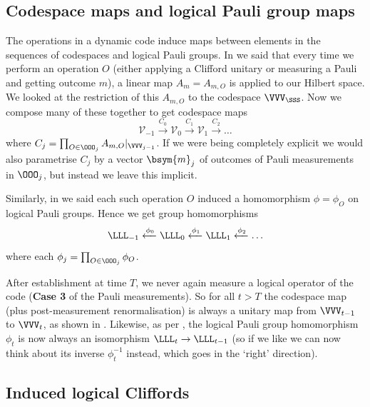 \subsection{Codespace maps and logical Pauli group maps}

The operations in a dynamic code induce maps between elements in the sequences of codespaces and logical Pauli groups.
In  we said that every time we perform an operation $O$ (either applying a Clifford unitary or measuring a Pauli and getting outcome $m$), a linear map $A_m = A_{m, O}$ is applied to our Hilbert space.
We looked at the restriction of this $A_{m, O}$ to the codespace $\VVV_\SSS$.
Now we compose many of these together to get codespace maps
\begin{equation}\label{eq:codespace_maps}
    \mathcal{V}_{-1} \xrightarrow{C_0} \mathcal{V}_{0} \xrightarrow{C_1} \mathcal{V}_{1} \xrightarrow{C_2} \ldots
\end{equation}
where $C_j = \prod_{O \in \OOO_j} A_{m, O}|_{\VVV_{j-1}}$.
If we were being completely explicit we would also parametrise $C_j$ by a vector $\bsym{m}_j$ of outcomes of Pauli measurements in $\OOO_j$, but instead we leave this implicit.

Similarly, in  we said each such operation $O$ induced a homomorphism $\phi = \phi_O$ on logical Pauli groups.
Hence we get group homomorphisms
\begin{equation}\label{eq:logical_pauli_group_maps}
    \LLL_{-1} \xleftarrow{\phi_0} \LLL_0 \xleftarrow{\phi_1} \LLL_1 \xleftarrow{\phi_2} \ldots
\end{equation}
where each $\phi_j = \prod_{O \in \OOO_j} \phi_O$.

After establishment at time $T$, we never again measure a logical operator of the code (\textbf{Case 3} of the Pauli measurements).
So for all $t > T$ the codespace map (plus post-measurement renormalisation) is always a unitary map from $\VVV_{t-1}$ to $\VVV_t$, as shown in .
Likewise, as per , the logical Pauli group homomorphism $\phi_t$ is now always an isomorphism $\LLL_t \to \LLL_{t-1}$ (so if we like we can now think about its inverse $\phi_t^{-1}$ instead, which goes in the `right' direction).

\subsection{Induced logical Cliffords}

